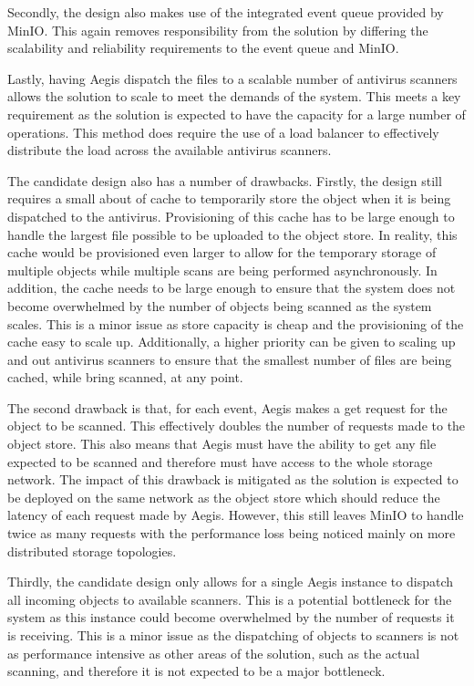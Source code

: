 \documentclass[12pt, conference, final, a4paper, onecolumn, compsoc]{IEEEtran}
\begin{document}
Secondly, the design also makes use of the integrated event queue provided by
MinIO. This again removes responsibility from the solution by differing the
scalability and reliability requirements to the event queue and MinIO.

Lastly, having Aegis dispatch the files to a scalable number of antivirus
scanners allows the solution to scale to meet the demands of the system. This
meets a key requirement as the solution is expected to have the capacity for a
large number of operations. This method does require the use of a load balancer
to effectively distribute the load across the available antivirus scanners.

The candidate design also has a number of drawbacks. Firstly, the design still
requires a small about of cache to temporarily store the object when it is being
dispatched to the antivirus. Provisioning of this cache has to be large enough
to handle the largest file possible to be uploaded to the object store. In
reality, this cache would be provisioned even larger to allow for the temporary
storage of multiple objects while multiple scans are being performed
asynchronously. In addition, the cache needs to be large enough to ensure that
the system does not become overwhelmed by the number of objects being scanned as
the system scales. This is a minor issue as store capacity is cheap and the
provisioning of the cache easy to scale up. Additionally, a higher priority can
be given to scaling up and out antivirus scanners to ensure that the smallest
number of files are being cached, while bring scanned, at any point.

The second drawback is that, for each event, Aegis makes a get request for the
object to be scanned. This effectively doubles the number of requests made to
the object store. This also means that Aegis must have the ability to get any
file expected to be scanned and therefore must have access to the whole storage
network. The impact of this drawback is mitigated as the solution is expected to
be deployed on the same network as the object store which should reduce the
latency of each request made by Aegis. However, this still leaves MinIO to
handle twice as many requests with the performance loss being noticed mainly on
more distributed storage topologies.

Thirdly, the candidate design only allows for a single Aegis instance to
dispatch all incoming objects to available scanners. This is a potential
bottleneck for the system as this instance could become overwhelmed by the
number of requests it is receiving. This is a minor issue as the dispatching of
objects to scanners is not as performance intensive as other areas of the
solution, such as the actual scanning, and therefore it is not expected to be a
major bottleneck.
\end{document}
